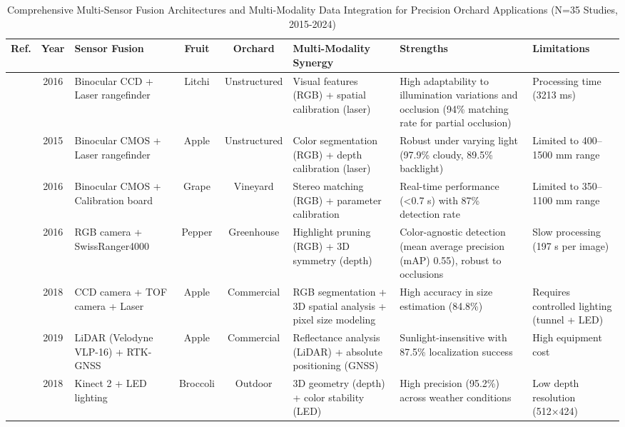 \documentclass{ieeeaccess}
\begin{document}
\begin{table}[ht]
\small
\centering
\caption{Comprehensive Multi-Sensor Fusion Architectures and Multi-Modality Data Integration for Precision Orchard Applications (N=35 Studies, 2015-2024)} 
\label{tab:dataset}
\renewcommand{\arraystretch}{1.2}
\begin{tabularx}{\textwidth}{c c X c c X X X}
\hline
\textbf{Ref.} & \textbf{Year} & \textbf{Sensor Fusion} & \textbf{Fruit} & \textbf{Orchard} & \textbf{Multi-Modality Synergy} & \textbf{Strengths} & \textbf{Limitations} \\ 
\hline
\cite{wang2016localisation} & 2016 & Binocular CCD + Laser rangefinder & Litchi & Unstructured & Visual features (RGB) + spatial calibration (laser) & High adaptability to illumination variations and occlusion (94\% matching rate for partial occlusion) & Processing time (3213 ms) \\ 
\hline
\cite{si2015location} & 2015 & Binocular CMOS + Laser rangefinder & Apple & Unstructured & Color segmentation (RGB) + depth calibration (laser) & Robust under varying light (97.9\% cloudy, 89.5\% backlight) & Limited to 400–1500 mm range  \\ 
\hline
\cite{luo2016vision} & 2016 & Binocular CMOS + Calibration board & Grape & Vineyard & Stereo matching (RGB) + parameter calibration & Real-time performance (<0.7 s) with 87\% detection rate & Limited to 350–1100 mm range  \\ 
\hline
\cite{barnea2016colour} & 2016 & RGB camera + SwissRanger4000 & Pepper & Greenhouse & Highlight pruning (RGB) + 3D symmetry (depth) & Color-agnostic detection (mean average precision (mAP) 0.55), robust to occlusions & Slow processing (197 s per image)  \\ 
\hline
\cite{gongal2018apple} & 2018 & CCD camera + TOF camera + Laser & Apple & Commercial & RGB segmentation + 3D spatial analysis + pixel size modeling & High accuracy in size estimation (84.8\%) & Requires controlled lighting (tunnel + LED) \\ 
\hline
\cite{gene2019fruit} & 2019 & LiDAR (Velodyne VLP-16) + RTK-GNSS & Apple & Commercial & Reflectance analysis (LiDAR) + absolute positioning (GNSS) & Sunlight-insensitive with 87.5\% localization success & High equipment cost  \\ 
\hline
\cite{kusumam20173d} & 2018 & Kinect 2 + LED lighting & Broccoli & Outdoor & 3D geometry (depth) + color stability (LED) & High precision (95.2\%) across weather conditions & Low depth resolution (512×424)  \\ 

\end{tabularx}
\end{table}
\end{document}

